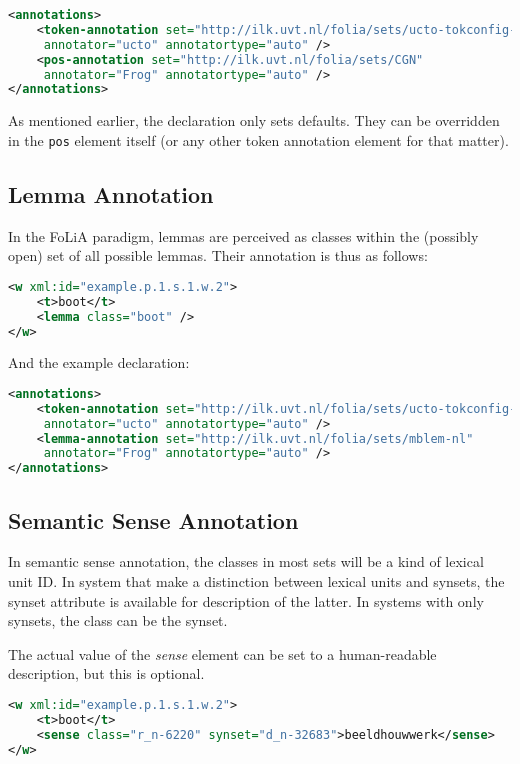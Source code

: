 \documentclass[a4paper,12pt]{report}
\begin{document}
\begin{lstlisting}[language=xml]
<annotations>
    <token-annotation set="http://ilk.uvt.nl/folia/sets/ucto-tokconfig-nl" 
     annotator="ucto" annotatortype="auto" />
    <pos-annotation set="http://ilk.uvt.nl/folia/sets/CGN" 
     annotator="Frog" annotatortype="auto" />
</annotations>
\end{lstlisting}

As mentioned earlier, the declaration only sets defaults. They can be overridden in the \texttt{pos} element itself (or any other token annotation element for that matter).

\subsection{Lemma Annotation}

In the FoLiA paradigm, lemmas are perceived as classes within the (possibly open) set of all possible lemmas. Their annotation is thus as follows:

\begin{lstlisting}[language=xml]
<w xml:id="example.p.1.s.1.w.2">
    <t>boot</t>
    <lemma class="boot" />
</w>
\end{lstlisting}

And the example declaration:

\begin{lstlisting}[language=xml]
<annotations>
    <token-annotation set="http://ilk.uvt.nl/folia/sets/ucto-tokconfig-nl" 
     annotator="ucto" annotatortype="auto" />
    <lemma-annotation set="http://ilk.uvt.nl/folia/sets/mblem-nl"
     annotator="Frog" annotatortype="auto" />
</annotations>
\end{lstlisting}


\subsection{Semantic Sense Annotation}

In semantic sense annotation, the classes in most sets will be a kind of lexical unit ID. In system that make a distinction between lexical units and synsets, the synset attribute is available for description of the latter. In systems with only synsets, the class can be the synset.

The actual value of the \emph{sense} element can be set to a human-readable description, but this is optional.

\begin{lstlisting}[language=xml]
<w xml:id="example.p.1.s.1.w.2">
    <t>boot</t>
    <sense class="r_n-6220" synset="d_n-32683">beeldhouwwerk</sense>
</w>
\end{lstlisting}
\end{document}
